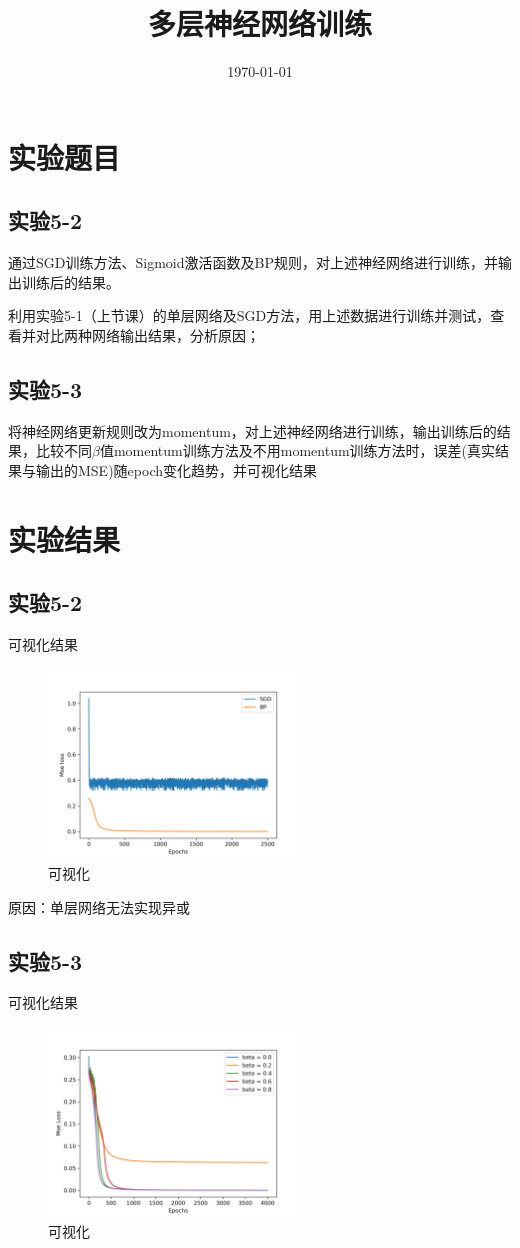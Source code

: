 \documentclass{../source/Experiment}
\title{多层神经网络训练}
\date{\today}
\begin{document}
\makecover
\section{实验题目}
\subsection{实验5-2}

通过SGD训练方法、Sigmoid激活函数及BP规则，对上述神经网络进行训练，并输出训练后的结果。

利用实验5-1（上节课）的单层网络及SGD方法，用上述数据进行训练并测试，查看并对比两种网络输出结果，分析原因；

\subsection{实验5-3}

将神经网络更新规则改为momentum，对上述神经网络进行训练，输出训练后的结果，比较不同$\beta$值momentum训练方法及不用momentum训练方法时，误差(真实结果与输出的MSE)随epoch变化趋势，并可视化结果

\section{实验结果}
\subsection{实验5-2}
可视化结果
\begin{figure}[H]
    \centering
    \includegraphics[width = 0.6\textwidth]{Part5/参考/lab5_2.png}
    \caption{可视化}
\end{figure}

原因：单层网络无法实现异或

\subsection{实验5-3}
可视化结果
\begin{figure}[H]
    \centering
    \includegraphics[width = 0.6\textwidth]{Part5/参考/lab5_3.jpg}
    \caption{可视化}
\end{figure}
\end{document}
